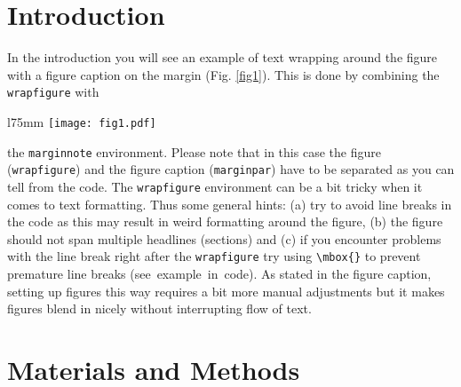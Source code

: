 \documentclass[10pt,letterpaper]{article}
\begin{document}
\section*{Introduction}
In the introduction you will see an example of text wrapping around the figure with a figure caption on the margin (Fig. \ref{fig1}). This is done by combining the \verb!wrapfigure! with %
\begin{wrapfigure}[19]{l}{75mm}
\texttt{[image: fig1.pdf]}
\captionsetup{labelformat=empty} %
\caption{} %
\label{fig1} %
\end{wrapfigure} %
the \verb!marginnote! environment. Please note that in this case the figure (\verb!wrapfigure!) and the figure caption (\verb!marginpar!) have to be separated as you can tell from the code. The \verb!wrapfigure! environment can be a bit tricky when it comes to text formatting. Thus some general hints: (a) try to avoid line breaks in the code as this may result in weird formatting around the figure, (b) the figure should not span multiple headlines (sections) and (c) if you encounter problems with the line break right after the \verb!wrapfigure! try using \verb!\mbox{}! to prevent premature line breaks (\mbox{see example in code}). As stated in the figure caption, setting up figures this way requires a bit more manual adjustments but it makes figures blend in nicely without interrupting flow of text.

\section*{Materials and Methods}
\end{document}
